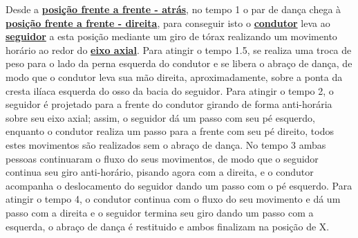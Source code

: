 Desde a \hyperref[def:ffa-position]{\textbf{posição frente a frente - atrás}},
no tempo 1 o par de dança chega à \hyperref[def:ffd-position]{\textbf{posição frente a frente - direita}},
para conseguir isto o \hyperref[def:Condutor]{\textbf{condutor}} 
leva ao \hyperref[def:Seguidor]{\textbf{seguidor}} a esta posição 
mediante um giro de tórax realizando um movimento horário 
ao redor do \hyperref[def:EixoAxial]{\textbf{eixo axial}}.
Para atingir o tempo 1.5, se realiza uma troca de peso para o lado da perna esquerda do condutor
e se libera o abraço de dança, de modo que o condutor leva sua mão direita, aproximadamente,
sobre a ponta da cresta ilíaca esquerda do osso da bacia do seguidor.
Para atingir o tempo 2, o seguidor é projetado para a frente do condutor 
girando de forma anti-horária sobre seu eixo axial; assim, o seguidor dá um passo 
com seu pé esquerdo, enquanto o condutor realiza um passo para a frente com seu pé direito,
todos estes movimentos são realizados sem o abraço de dança.
No tempo 3 ambas pessoas continuaram o fluxo do seus movimentos,
de modo que o seguidor continua seu giro anti-horário, pisando agora com a direita,
e o condutor acompanha o deslocamento do seguidor dando um passo com o pé esquerdo.
Para atingir o tempo 4, o condutor continua com o fluxo do seu movimento e dá 
um passo com a direita e o seguidor termina seu giro dando um passo com a esquerda,
o abraço de dança é restituido e ambos finalizam na posição de X.

